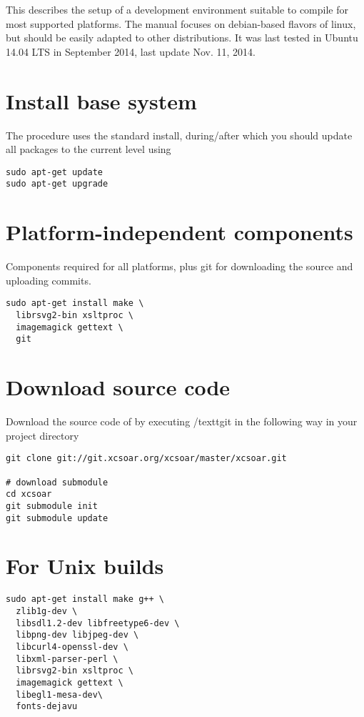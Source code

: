 This describes the setup of a development environment suitable to compile \xc for most supported platforms. The manual focuses on debian-based flavors of linux, but should be easily adapted to other distributions. It was last tested in Ubuntu 14.04 LTS in September 2014, last update Nov. 11, 2014.

\section{Install base system}
The procedure uses the standard install, during/after which you should update all packages to the current level using

\begin{verbatim}
sudo apt-get update
sudo apt-get upgrade
\end{verbatim}

\section{Platform-independent components}

Components required for all platforms, plus git for downloading the source and uploading commits.

\begin{verbatim}
sudo apt-get install make \
  librsvg2-bin xsltproc \
  imagemagick gettext \
  git
\end{verbatim}

\section{Download source code}

Download the source code of \xc by executing /textt{git} in the following way in your project directory
\begin{verbatim}
git clone git://git.xcsoar.org/xcsoar/master/xcsoar.git

# download submodule
cd xcsoar
git submodule init
git submodule update
\end{verbatim}


\section{For Unix builds}
\begin{verbatim}
sudo apt-get install make g++ \
  zlib1g-dev \
  libsdl1.2-dev libfreetype6-dev \
  libpng-dev libjpeg-dev \
  libcurl4-openssl-dev \
  libxml-parser-perl \
  librsvg2-bin xsltproc \
  imagemagick gettext \
  libegl1-mesa-dev\
  fonts-dejavu
\end{verbatim}

